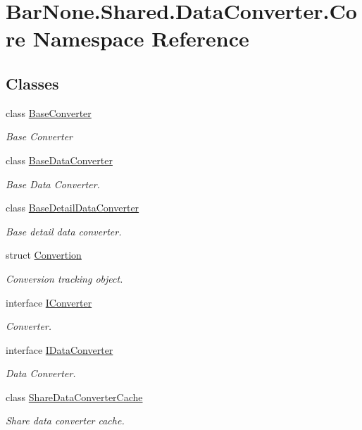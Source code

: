 \hypertarget{namespace_bar_none_1_1_shared_1_1_data_converter_1_1_core}{}\section{Bar\+None.\+Shared.\+Data\+Converter.\+Core Namespace Reference}
\label{namespace_bar_none_1_1_shared_1_1_data_converter_1_1_core}
\subsection*{Classes}
\begin{DoxyCompactItemize}
\item 
class \mbox{\hyperlink{class_bar_none_1_1_shared_1_1_data_converter_1_1_core_1_1_base_converter}{Base\+Converter}}
\begin{DoxyCompactList}\small\item\em Base Converter \end{DoxyCompactList}\item 
class \mbox{\hyperlink{class_bar_none_1_1_shared_1_1_data_converter_1_1_core_1_1_base_data_converter}{Base\+Data\+Converter}}
\begin{DoxyCompactList}\small\item\em Base Data Converter. \end{DoxyCompactList}\item 
class \mbox{\hyperlink{class_bar_none_1_1_shared_1_1_data_converter_1_1_core_1_1_base_detail_data_converter}{Base\+Detail\+Data\+Converter}}
\begin{DoxyCompactList}\small\item\em Base detail data converter. \end{DoxyCompactList}\item 
struct \mbox{\hyperlink{struct_bar_none_1_1_shared_1_1_data_converter_1_1_core_1_1_convertion}{Convertion}}
\begin{DoxyCompactList}\small\item\em Conversion tracking object. \end{DoxyCompactList}\item 
interface \mbox{\hyperlink{interface_bar_none_1_1_shared_1_1_data_converter_1_1_core_1_1_i_converter}{I\+Converter}}
\begin{DoxyCompactList}\small\item\em Converter. \end{DoxyCompactList}\item 
interface \mbox{\hyperlink{interface_bar_none_1_1_shared_1_1_data_converter_1_1_core_1_1_i_data_converter}{I\+Data\+Converter}}
\begin{DoxyCompactList}\small\item\em Data Converter. \end{DoxyCompactList}\item 
class \mbox{\hyperlink{class_bar_none_1_1_shared_1_1_data_converter_1_1_core_1_1_share_data_converter_cache}{Share\+Data\+Converter\+Cache}}
\begin{DoxyCompactList}\small\item\em Share data converter cache. \end{DoxyCompactList}\end{DoxyCompactItemize}
